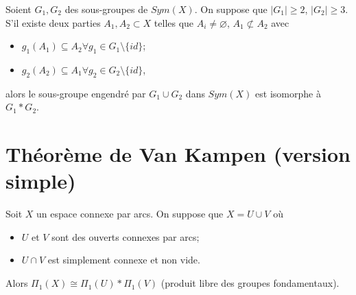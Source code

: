   \begin{lem} 
    Soient $G_1, G_2$ des sous-groupes de $Sym(X)$. On suppose que $|G_1| \geq 2$, $|G_2| \geq 3$. S'il existe
    deux parties $A_1, A_2 \subset X$ telles que $A_i \neq \varnothing$, $A_1 \not\subset A_2$ avec 
    \begin{itemize}
    \item $g_1(A_1) \subseteq A_2 \forall g_1 \in G_1 \setminus \{id\}$;
    \item $g_2(A_2) \subseteq A_1 \forall g_2 \in G_2 \setminus \{id\}$,
    \end{itemize}
    alors le sous-groupe engendré par $G_1 \cup G_2$ dans $Sym(X)$ est isomorphe à $G_1 \ast G_2$.
  \end{lem}

  \section{Théorème de Van Kampen (version simple)}

  \begin{theo} 
    Soit $X$ un espace connexe par arcs. On suppose que $X = U \cup V$ où 
    \begin{itemize}
    \item $U$ et $V$ sont des ouverts connexes par arcs;
    \item $U \cap V$ est simplement connexe et non vide.
    \end{itemize}
    Alors $\Pi_1(X) \cong \Pi_1(U) \ast \Pi_1(V)$ (produit libre des groupes fondamentaux).
  \end{theo}

